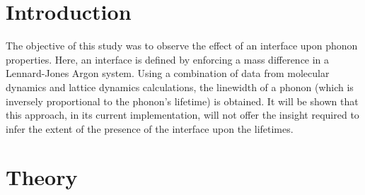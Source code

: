 \documentclass{article}
\begin{document}
\section*{Introduction}

The objective of this study was to observe the effect of an interface upon phonon properties. Here, an interface is defined by enforcing a mass difference in a Lennard-Jones Argon system. Using a combination of data from molecular dynamics and lattice dynamics calculations, the linewidth of a phonon (which is inversely proportional to the phonon's lifetime) is obtained. It will be shown that this approach, in its current implementation, will not offer the insight required to infer the extent of the presence of the interface upon the lifetimes.

\section*{Theory}
\end{document}
